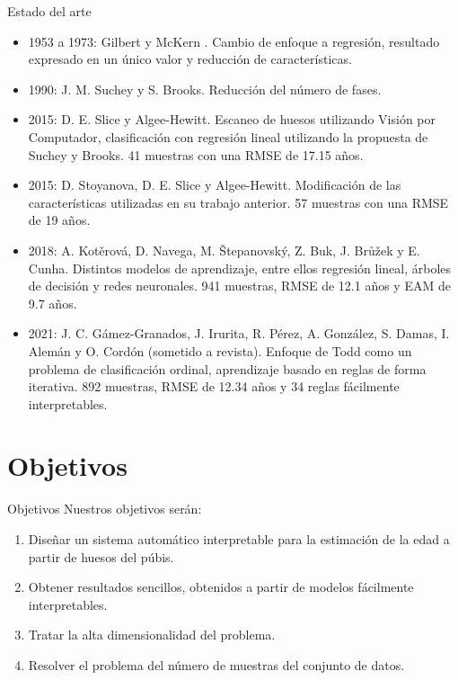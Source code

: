 \documentclass{beamer}
\begin{document}
\begin{frame}[allowframebreaks]{Estado del arte}

\begin{itemize}
\item 1953 a 1973: Gilbert y McKern \cite{propuestaGilbert}. Cambio de enfoque a regresión, resultado expresado en un único valor y reducción de características.

\item 1990: J. M. Suchey y S. Brooks. Reducción del número de fases.

\item 2015: D. E. Slice y Algee-Hewitt. Escaneo de huesos utilizando Visión por Computador, clasificación con regresión lineal utilizando la propuesta de Suchey y Brooks. 41 muestras con una RMSE de 17.15 años.

\item 2015: D. Stoyanova, D. E. Slice y Algee-Hewitt. Modificación de las características utilizadas en su trabajo anterior. 57 muestras con una RMSE de 19 años.

\item 2018: A. Kotěrová, D. Navega, M. Štepanovský, Z. Buk, J. Brůžek y E. Cunha. Distintos modelos de aprendizaje, entre ellos regresión lineal, árboles de decisión y redes neuronales. 941 muestras, RMSE de 12.1 años y EAM de 9.7 años.

\item 2021: J. C. Gámez-Granados, J. Irurita, R. Pérez, A. González, S. Damas, I. Alemán y O. Cordón (sometido a revista). Enfoque de Todd como un problema de clasificación ordinal, aprendizaje basado en reglas de forma iterativa. 892 muestras, RMSE de 12.34 años y 34 reglas fácilmente interpretables.

\end{itemize}

\end{frame}


\section{Objetivos}
\begin{frame}{Objetivos}
Nuestros objetivos serán:

\begin{enumerate}
	\item Diseñar un sistema automático interpretable para la estimación de la edad a partir de huesos del púbis.
	\item Obtener resultados sencillos, obtenidos a partir de modelos fácilmente interpretables.
	\item Tratar la alta dimensionalidad del problema.
	\item Resolver el problema del número de muestras del conjunto de datos.
\end{enumerate}

\end{frame}
\end{document}
